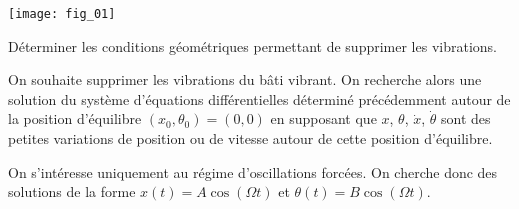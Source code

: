 \begin{marginfigure}
\texttt{[image: fig\_01]}
\end{marginfigure}

\begin{obj}
Déterminer les conditions géométriques permettant de supprimer les vibrations.
\end{obj}

\ifprof
\begin{corrige}
\end{corrige}
\else
\fi


\ifprof
\begin{corrige}
\end{corrige}
\else
\fi


\ifprof
\begin{corrige}
\end{corrige}
\else
\fi
On souhaite supprimer les vibrations du bâti vibrant. On recherche alors une solution du système d’équations différentielles
déterminé précédemment autour de la position d’équilibre $\left(x_0,\theta_0\right)=(0,0)$ en supposant que $x$, $\theta$, $\dot{x}$, $\dot{\theta}$ sont des petites variations
de position ou de vitesse autour de cette position d’équilibre.


\ifprof
\begin{corrige}
\end{corrige}
\else
\fi

On s’intéresse uniquement au régime d’oscillations forcées. On cherche donc des solutions de la forme $x(t)=A\cos\left( \Omega t \right)$ et $\theta(t)=B\cos\left( \Omega t \right)$.


\ifprof
\begin{corrige}
\end{corrige}
\else
\fi



\ifprof
\begin{corrige}
\end{corrige}
\else
\fi




